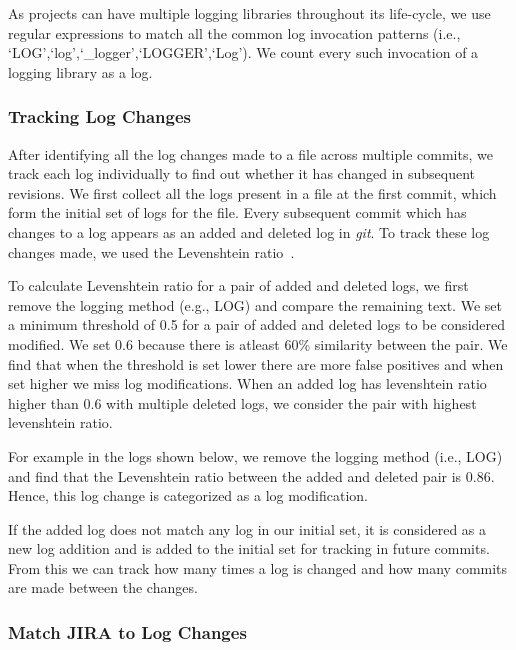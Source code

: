 
As projects can have multiple logging libraries throughout its life-cycle, we use regular expressions to match all the common log invocation patterns (i.e., `LOG',`log',`\_logger',`LOGGER',`Log'). We count every such invocation of a logging library as a log.


\subsubsection{Tracking Log Changes}
After identifying all the log changes made to a file across multiple commits, we track each log individually to find out whether it has changed in subsequent revisions. We first collect all the logs present in a file at the first commit, which form the initial set of logs for the file. Every subsequent commit which has changes to a log appears as an added and deleted log in \textsl{git}. To track these log changes made, we used the Levenshtein ratio~\cite{levenshteinratio}.

To calculate Levenshtein ratio for a pair of added and deleted logs, we first remove the logging method (e.g., LOG) and compare the remaining text. We set a minimum threshold of 0.5 for a pair of added and deleted logs to be considered modified. We set 0.6 because there is atleast 60\% similarity between the pair. We find that when the threshold is set lower there are more false positives and when set higher we miss log modifications. When an added log has levenshtein ratio higher than 0.6 with multiple deleted logs, we consider the pair with highest levenshtein ratio. 

 For example in the logs shown below, we remove the logging method (i.e., LOG) and find that the Levenshtein ratio between the added and deleted pair is 0.86. Hence, this log change is categorized as a log modification.  


If the added log does not match any log in our initial set, it is considered as a new log addition and is added to the initial set for tracking in future commits. From this we can track how many times a log is changed and how many commits are made between the changes. 


\subsubsection{Match JIRA to Log Changes}

